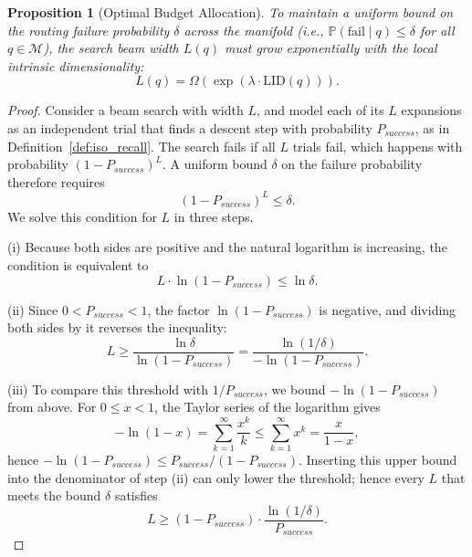 \documentclass{article}
\theoremstyle{plain}
\newtheorem{proposition}[theorem]{Proposition}
\theoremstyle{definition}
\theoremstyle{remark}
\begin{document}
\begin{proposition}[Optimal Budget Allocation]
\label{proof:oba}
To maintain a uniform bound on the routing failure probability $\delta$ across the manifold (i.e., $\mathbb{P}(\text{fail}\;|\;q) \le \delta$ for all $q \in \mathcal{M}$), the search beam width $L(q)$ must grow exponentially with the local intrinsic dimensionality:
\begin{equation}
    L(q) = \Omega\left( \exp\left( \lambda \cdot \text{LID}(q) \right) \right).
\end{equation}
\end{proposition}

\begin{proof}
Consider a beam search with width $L$, and model each of its $L$ expansions as an independent trial that finds a descent step with probability $P_{success}$, as in Definition~\ref{def:iso_recall}. The search fails if all $L$ trials fail, which happens with probability $(1 - P_{success})^L$. A uniform bound $\delta$ on the failure probability therefore requires
\begin{equation}
    (1 - P_{success})^L \le \delta.
\end{equation}
We solve this condition for $L$ in three steps.

(i) Because both sides are positive and the natural logarithm is increasing, the condition is equivalent to
\begin{equation}
    L \cdot \ln(1 - P_{success}) \le \ln \delta.
\end{equation}

(ii) Since $0 < P_{success} < 1$, the factor $\ln(1 - P_{success})$ is negative, and dividing both sides by it reverses the inequality:
\begin{equation}
    L \ge \frac{\ln \delta}{\ln(1 - P_{success})} = \frac{\ln(1/\delta)}{-\ln(1 - P_{success})}.
\end{equation}

(iii) To compare this threshold with $1/P_{success}$, we bound $-\ln(1 - P_{success})$ from above. For $0 \le x < 1$, the Taylor series of the logarithm gives
\begin{equation}
    -\ln(1 - x) = \sum_{k=1}^{\infty} \frac{x^k}{k} \le \sum_{k=1}^{\infty} x^k = \frac{x}{1 - x},
\end{equation}
hence $-\ln(1 - P_{success}) \le P_{success}/(1 - P_{success})$. Inserting this upper bound into the denominator of step (ii) can only lower the threshold; hence every $L$ that meets the bound $\delta$ satisfies
\begin{equation}
    L \ge (1 - P_{success}) \cdot \frac{\ln(1/\delta)}{P_{success}}.
\end{equation}


\end{proof}
\end{document}
